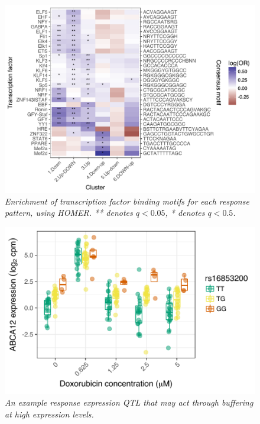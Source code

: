 \documentclass{article}
\begin{document}
\begin{figure}[h]
\begin{center}
    \includegraphics[width=1\textwidth]{../figures/cluster_tf.pdf} %
    \caption{\it{Enrichment of transcription factor binding motifs for each response pattern, using HOMER. ** denotes $q<0.05$, * denotes $q<0.5$.}}
    \label{fig:tf}
    \end{center}
\end{figure}

\begin{figure}[h]
\begin{center}
    \includegraphics[width=.6\textwidth]{../figures/ABCA12.pdf} %
    \caption{\it{An example response expression QTL that may act through buffering at high expression levels.}}
    \label{fig:ABCA12}
    \end{center}
\end{figure}
\end{document}
